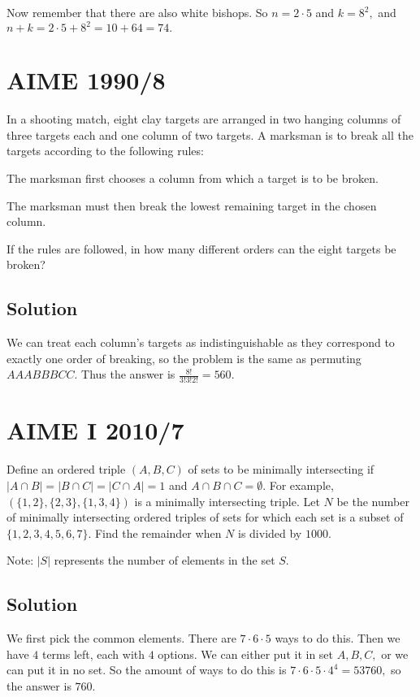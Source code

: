 \documentclass{article}
\begin{document}
Now remember that there are also white bishops. So $n=2\cdot 5$ and $k=8^2,$ and $n+k=2\cdot 5+8^2=10+64=74.$
\pagebreak\section{AIME 1990/8}
In a shooting match, eight clay targets are arranged in two hanging columns of three targets each and one column of two targets. A marksman is to break all the targets according to the following rules:

    \begin{itemize}
         \Item The marksman first chooses a column from which a target is to be broken.

         \Item The marksman must then break the lowest remaining target in the chosen column.
    \end{itemize}

    If the rules are followed, in how many different orders can the eight targets be broken?

\subsection{Solution}

We can treat each column's targets as indistinguishable as they correspond to exactly one order of breaking, so the problem is the same as permuting $AAABBBCC.$ Thus the answer is $\frac{8!}{3!3!2!}=560.$

\pagebreak\section{AIME I 2010/7}

Define an ordered triple $(A, B, C)$ of sets to be minimally intersecting if $|A \cap B| = |B \cap C| = |C \cap A| = 1$ and $ A \cap B \cap C = \emptyset$. For example, $(\{1,2\},\{2,3\},\{1,3,4\})$ is a minimally intersecting triple. Let $N$ be the number of minimally intersecting ordered triples of sets for which each set is a subset of $\{1,2,3,4,5,6,7\}$. Find the remainder when $N$ is divided by $1000$.

Note: $|S|$ represents the number of elements in the set $S.$

\subsection{Solution}
We first pick the common elements. There are $7\cdot 6\cdot 5$ ways to do this. Then we have $4$ terms left, each with $4$ options. We can either put it in set $A,B,C,$ or we can put it in no set. So the amount of ways to do this is $7\cdot 6\cdot 5\cdot 4^4=53760,$ so the answer is $760.$
\end{document}
